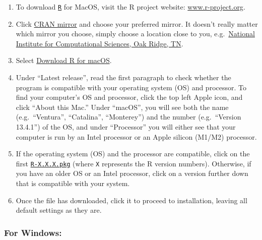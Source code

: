 \documentclass[
]{book}
\providecommand{\tightlist}{%
  \setlength{\itemsep}{0pt}\setlength{\parskip}{0pt}}
\begin{document}
\begin{enumerate}
\def\labelenumi{\arabic{enumi}.}
\tightlist
\item
  To download \href{https://www.r-project.org/}{\texttt{R}} for MacOS, visit the R project website: \href{https://www.r-project.org/}{www.r-project.org}.
\item
  Click \href{https://cran.r-project.org/mirrors.html}{CRAN mirror} and choose your preferred mirror. It doesn't really matter which mirror you choose, simply choose a location close to you, e.g.~\href{https://mirrors.nics.utk.edu/cran/}{National Institute for Computational Sciences, Oak Ridge, TN}.
\item
  Select \href{https://mirrors.nics.utk.edu/cran/}{Download R for macOS}.
\item
  Under ``Latest release'', read the first paragraph to check whether the program is compatible with your operating system (OS) and processor. To find your computer's OS and processor, click the top left Apple icon, and click ``About this Mac.'' Under ``macOS'', you will see both the name (e.g.~``Ventura'', ``Catalina'', ``Monterey'') and the number (e.g.~``Version 13.4.1'') of the OS, and under ``Processor'' you will either see that your computer is run by an Intel processor or an Apple silicon (M1/M2) processor.
\item
  If the operating system (OS) and the processor are compatible, click on the first \href{https://mirrors.nics.utk.edu/cran/bin/macosx/big-sur-x86_64/base/R-4.3.1-x86_64.pkg}{\texttt{R-X.X.X.pkg}} (where \texttt{X} represents the R version numbers). Otherwise, if you have an older OS or an Intel processor, click on a version further down that is compatible with your system.
\item
  Once the file has downloaded, click it to proceed to installation, leaving all default settings as they are.
\end{enumerate}

\hypertarget{for-windows}{%
\subsubsection*{For Windows:}\label{for-windows}}
\end{document}
